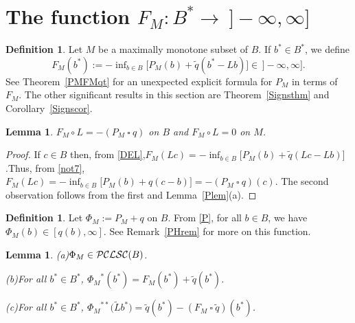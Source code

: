 \documentclass[letterpaper]{article}
\theoremstyle{plain}
\newtheorem{lemma}[theorem]{Lemma}
\theoremstyle{definition}
\newtheorem{definition}[theorem]{Definition}
\numberwithin{equation}{section}
\newcommand{\dbs}{^{**}}
\newcommand{\infn}{\inf\nolimits}
\newcommand{\Lt}{{\wt L}}
\newcommand{\PCLSC}{{\cal PCLSC}}
\newcommand{\qt}{\wt q}
\newcommand{\ssquare}{\ \square\ }
\newcommand{\wt}{\widetilde}
\newcommand{\Cor}{Corollary~\ref}
\newcommand{\Def}{Definition~\ref}
\newcommand{\Lem}{Lemma~\ref}
\newcommand{\Rem}{Remark~\ref}
\newcommand{\Thm}{Theorem~\ref}
\begin{document}
\section{The function $F_M\colon B^* \to\ ]-\infty,\infty]$}\label{Fsec}
\begin{definition}\label{Fdef}
Let $M$ be a maximally monotone subset of $B$.   If $b^* \in B^*$, we define
\begin{equation}\label{DEL}
 F_M(b^*):=  -\infn_{b \in B}\big[P_M(b) + \qt(b^* - Lb)\big] \in \,]-\infty,\infty].
\end{equation}
%
See \Thm{PMFMqt} for an unexpected explicit formula for $P_M$ in terms of $F_M$.  The other significant results in this section are \Thm{Signsthm} and \Cor{Signscor}.  
\end{definition}
\begin{lemma}\label{FMLPMq}
$F_M \circ L = -(P_M\ssquare q)$ on $B$ and $F_M \circ L =  0$ on $M$.  
\end{lemma}
%
\begin{proof}
If $c \in B$ then, from \eqref{DEL},\quad $F_M(Lc) =  -\infn_{b \in B}\big[P_M(b) + \qt(Lc - Lb)\big]$.\quad   Thus, from \eqref{not7}, $F_M(Lc) = -\infn_{b \in B}\big[P_M(b) + q(c - b)\big]
= -(P_M\ssquare q)(c)$.   The second observation follows from the first and \Lem{Plem}(a). 
\end{proof}
%
\begin{definition}\label{PHIdef}
Let $\Phi_M := P_M + q$ on $B$.  From \eqref{P}, for all $b \in B$, we have $\Phi_M(b)\in [q(b),\infty]$.   See \Rem{PHrem} for more on this function.
\end{definition}
\begin{lemma}\label{Flem}
{\rm(a)}\enspace $\Phi_M \in \PCLSC(B)$.\par\noindent
{\rm(b)}\enspace For all $b^* \in B^*$, ${\Phi_M}^*(b^*) = F_M(b^*) + \qt(b^*)$.\par\noindent
{\rm(c)}\enspace  For all $b^* \in B^*$, ${\Phi_M}\dbs\big(\Lt b^*\big) = \qt(b^*) -(F_M \ssquare \qt)(b^*)$.
\end{lemma}
%
\end{document}
